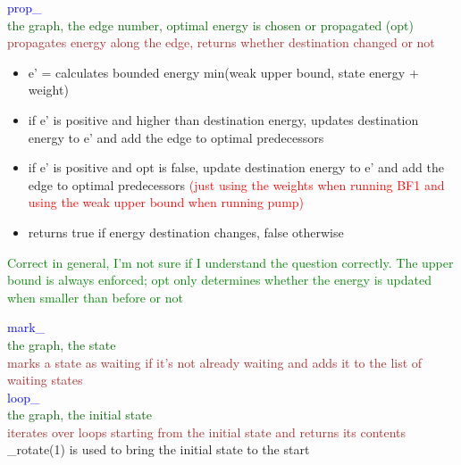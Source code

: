 \documentclass{rapport}
\newcommand{\pscrep}[1]{\textcolor{green}{#1}}
\begin{document}
\vspace{12pt}

\textcolor{blue}{prop_} \\
\textcolor[HTML]{006400}{the graph, the edge number, optimal energy is chosen or propagated (opt)}\\
\textcolor{brown}{propagates energy along the edge, returns whether destination changed or not}
\begin{itemize}
    \item e’ = calculates bounded energy min(weak upper bound, state energy + weight)
    \item if e’ is positive and higher than destination energy, updates destination energy to e’ and add the edge to optimal predecessors
    \item if e’ is positive and opt is false, update destination energy to e’ and add the edge to optimal predecessors \textcolor{red}{(just using the weights when running BF1 and using the weak upper bound when running pump)}
    \item returns true if energy destination changes, false otherwise
\end{itemize}
\pscrep{Correct in general, I'm not sure if I understand the question correctly. The upper bound is always enforced; opt only determines whether the energy is updated when smaller than before or not}

\vspace{12pt}

\textcolor{blue}{mark_}\\
\textcolor[HTML]{006400}{the graph, the state}\\
\textcolor{brown}{marks a state as waiting if it’s not already waiting and adds it to the list of waiting states}\\

\textcolor{blue}{loop_}\\
\textcolor[HTML]{006400}{the graph, the initial state}\\
\textcolor{brown}{iterates over loops starting from the initial state and returns its contents}\\
\_rotate(1) is used to bring the initial state to the start\\

\newpage
\end{document}
